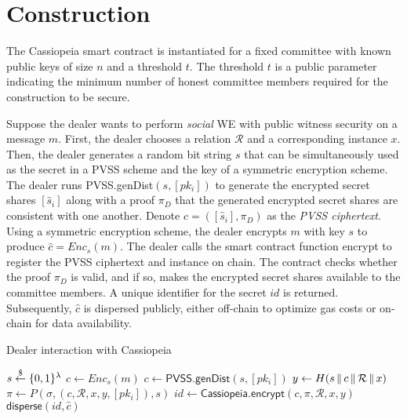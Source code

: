 \section{Construction}\label{section:construction_without_incentives}
The Cassiopeia smart contract is instantiated for a fixed committee with known public keys of size $n$ and a threshold $t$.
The threshold $t$ is a public parameter indicating the minimum number of honest committee members required for the construction to be secure.

Suppose the dealer wants to perform \emph{social} WE with public witness security on a message $m$.
First, the dealer chooses a relation $\mathcal{R}$ and a corresponding instance $x$.
Then, the dealer generates a random bit string $s$ that can be simultaneously used as the secret in a PVSS scheme and the key of a symmetric encryption scheme. %
The dealer runs \textsf{PVSS.genDist}$(s, [pk_i])$ to generate the encrypted secret shares $[\hat{s}_i]$ along with a proof $\pi_D$ that the generated encrypted secret shares are consistent with one another.
Denote $c = ([\hat{s}_i], \pi_D)$ as the \emph{PVSS ciphertext}.
Using a symmetric encryption scheme, the dealer encrypts $m$ with key $s$ to produce $\hat{c} = Enc_s(m)$.
The dealer calls the smart contract function \textsf{encrypt} to register the PVSS ciphertext and instance on chain.
The contract checks whether the proof $\pi_D$ is valid, and if so, makes the encrypted secret shares available to the committee members. 
A unique identifier for the secret $id$ is returned.
Subsequently, $\hat{c}$ is dispersed publicly, either off-chain to optimize gas costs or on-chain for data availability.

\begin{algorithm}[H]
\caption{Dealer interaction with Cassiopeia}
\label{alg:dealer_no_incentives}
    \begin{algorithmic}[1]
            \State $s \overset{\$}{\gets} \{0,1\}^{\lambda}$
            \State $\hat{c} \gets Enc_s(m)$
            \State $c \gets \textsf{PVSS.genDist}(s, [pk_i])$
            \State $y \gets H(s \,\|\, c \,\|\, \mathcal{R} \,\|\, x)$
            \State $\pi \gets P(\sigma, (c, \mathcal{R}, x, y, [pk_i]), s)$
            \State $id \gets \textsf{Cassiopeia.encrypt}(c, \pi, \mathcal{R}, x, y)$
            \State $\textsf{disperse}(id, \hat{c})$ %
        \EndFunction
    \end{algorithmic}
\end{algorithm}

